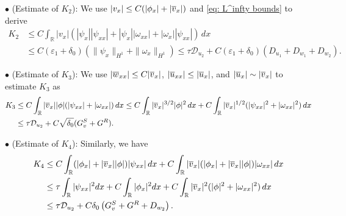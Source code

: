 \documentclass[11pt,reqno]{amsart}
\begin{document}
\begin{appendix}
\noindent $\bullet$ (Estimate of $K_2$):  We use $ |v_x| \le C ( |\phi_x| + |\overline{v}_x| )$ and \eqref{eq: L^infty bounds} to derive
\begin{align*}
K_2 &\le C \int_\mathbb{R} |v_x| ( |\psi_x| |\psi_{xx}| + |\psi_x| |\omega_{xx}| + |\omega_x| |\psi_{xx}|) \, dx \\
&\le C (\varepsilon_1 + \delta_0 ) \left( \|\psi_{x}\|_{H^1} + \|\omega_{x}\|_{H^1}\right) \le \tau \mathcal{D}_{u_2} + C (\varepsilon_1 + \delta_0 ) \left( D_{u_1} + D_{w_1} + D_{w_2} \right).
\end{align*}

\noindent $\bullet$ (Estimate of $K_3$): We use $|\overline{w}_{xx}| \le C  |\overline{v}_x|$, $|\overline{u}_{xx}| \le |\overline{u}_x|$, and $|\overline{u}_x| \sim |\overline{v}_x|$  to estimate $K_{3}$ as
\begin{align*} 
K_3 &\le C \int_\mathbb{R} |\overline{v}_x| |\phi| ( |\psi_{xx}| + |\omega_{xx}| ) \, dx \le C \int_\mathbb{R} |\overline{v}_x|^{3/2} |\phi|^2 \, dx + C \int_\mathbb{R} |\overline{v}_x|^{1/2}  ( |\psi_{xx}|^2 + |\omega_{xx}|^2 ) \, dx \\
&\le \tau \mathcal{D}_{u_2} + C \sqrt{\delta_0} (G^S_v+ G^R) .
\end{align*}

\noindent $\bullet$ (Estimate of $K_4$): Similarly, we have
\begin{align*}
K_4 &\le C \int_\mathbb{R}( |\phi_x| + | \overline{v}_x| |\phi|)|\psi_{xx}| \, dx + C \int_\mathbb{R} |\overline{v}_x| ( |\phi_x| + | \overline{v}_x| |\phi|) |\omega_{xx}| \, dx \\
&\le \tau\int_{\mathbb{R}} |\psi_{xx}|^2 dx + C \int_{\mathbb{R}} |\phi_x|^2 dx + C \int_\mathbb{R} |\overline{v}_x|^2 (|\phi|^2+|\omega_{xx}|^2) \, dx \\ 
&\le \tau \mathcal{D}_{u_2} + C \delta_0 \left(G^S_v+G^R+ D_{w_2} \right).
\end{align*}


\end{appendix}
\end{document}
